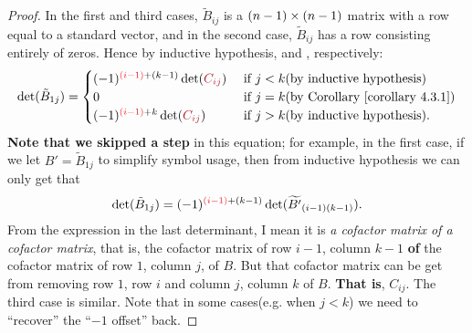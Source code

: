 \begin{proof}
In the first and third cases, \(\tilde{B}_{ij}\) is a \((n - 1) \times (n - 1)\) matrix with a row equal to a standard vector, and in the second case, \(\tilde{B}_{ij}\) has a row consisting entirely of zeros.
Hence by inductive hypothesis, and , respectively:
\begin{equation} \label{lem.4.1.det.of.tilde.B.1j}
    \det(\tilde{B}_{1 j}) =
    \begin{cases}
        (-1)^{\RED{(i-1)} + (k-1)} \det(\MAROON{C_{ij}}) & \text { if } j < k \text{(by inductive hypothesis)} \\
        0 & \text { if } j = k \text{(by \CORO{4.3.1})} \\
        (-1)^{\RED{(i-1)} + k} \det(\MAROON{C_{ij}}) & \text { if } j > k \text{(by inductive hypothesis)}.
    \end{cases}
\end{equation}
\textbf{Note that we skipped a step} in this equation;
for example, in the first case, if we let \(B' = \tilde{B}_{1j}\) to simplify symbol usage, then from inductive hypothesis we can only get that
\[
    \det(\tilde{B}_{1 j}) = (-1)^{\RED{(i-1)} + (k-1)} \det(\widetilde{B'}_{(i-1)(k-1)}).
\]
From the expression in the last determinant, I mean it is \emph{a cofactor matrix of a cofactor matrix}, that is,
the cofactor matrix of row \(i-1\), column \(k-1\) \textbf{of} the cofactor matrix of row \(1\), column \(j\), of \(B\).
But that cofactor matrix can be get from removing row \(1\), row \(i\) and column \(j\), column \(k\) of \(B\).
\textbf{That is}, \(C_{ij}\).
The third case is similar.
Note that in some cases(e.g. when \(j < k\)) we need to ``recover'' the ``\(-1\) offset'' back.


\end{proof}
